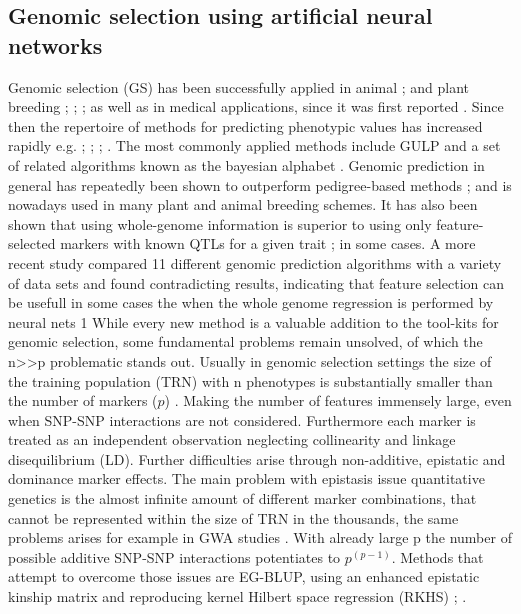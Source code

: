 \subsection{Genomic selection using artificial neural networks }
Genomic selection (GS) has been successfully applied in animal \cite{gianola2015one}; \cite{hayes2010genome}
and plant breeding \cite{crossa2010}; \cite{desta2014genomic}; \cite{heffner2010plant};
\cite{crossa2017} as well as in medical applications, since it was first reported
\cite{hayes2001}. Since then the repertoire of methods for predicting phenotypic values has increased rapidly
e.g. \cite{dlc2009}; \cite{habier2011}; \cite{gianola2013}; \cite{crossa2017}. The most commonly applied
methods include GULP and a set of related algorithms known as the bayesian alphabet
\cite{gianola2009}. Genomic prediction in general has repeatedly been shown to outperform pedigree-based
methods \cite{crossa2010}; \cite{albrecht2011} and is nowadays used in many plant and animal breeding
schemes. It has also been shown that using whole-genome information is superior to using only feature-selected
markers with known QTLs for a given trait \cite{bernardo2007}; \cite{heffner2011} in some cases. A more recent
study \cite{azodi2019} compared 11 different genomic prediction algorithms with a variety of data sets and
found contradicting results, indicating that feature selection can be usefull in some cases the when the whole
genome regression is performed by neural nets 1 While every new method is a valuable addition to the tool-kits
for genomic selection, some fundamental problems remain unsolved, of which the n>>p problematic stands
out. Usually in genomic selection settings the size of the training population (TRN) with n phenotypes is
substantially smaller than the number of markers ($p$) \cite{fan2014challenges}. Making the number of features
immensely large, even when SNP-SNP interactions are not considered. Furthermore each marker is treated as an
independent observation neglecting collinearity and linkage disequilibrium (LD). Further difficulties arise
through non-additive, epistatic and dominance marker effects. The main problem with epistasis issue
quantitative genetics is the almost infinite amount of different marker combinations, that cannot be
represented within the size of TRN in the thousands, the same problems arises for example in GWA studies
\cite{korte2013advantages}. With already large p the number of possible additive SNP-SNP interactions
potentiates to $p^{(p-1)}$. Methods that attempt to overcome those issues are EG-BLUP, using an enhanced
epistatic kinship matrix and reproducing kernel Hilbert space regression (RKHS) \cite{jiang2015};
\cite{martini2017genomic}.

